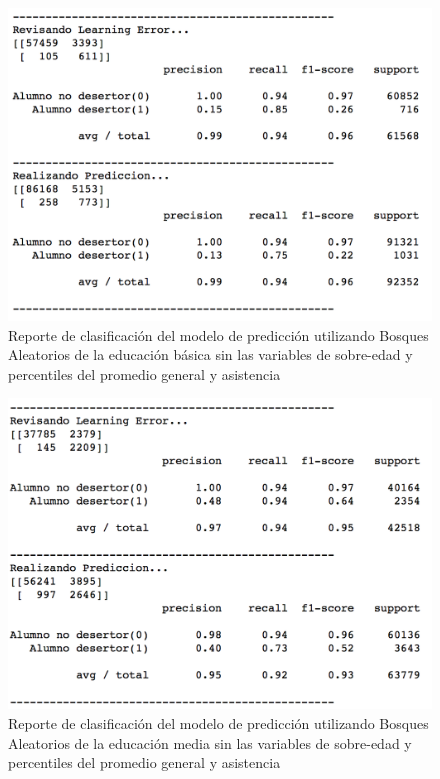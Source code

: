 \begin{figure}[H]
  \centering
    \includegraphics[trim=0cm 0cm 0cm 0cm,scale=0.65]{Figuras/7AnalisisResultado/clas-basica.png}
      \caption{Reporte de clasificación del modelo de predicción utilizando Bosques Aleatorios de la educación básica sin las variables de sobre-edad y percentiles del promedio general y asistencia}
    \label{fig:clas-basica}
\end{figure}
\begin{figure}[H]
  \centering
    \includegraphics[trim=0cm 0cm 0cm 0cm,scale=0.65]{Figuras/7AnalisisResultado/clas-media.png}
      \caption{Reporte de clasificación del modelo de predicción utilizando Bosques Aleatorios de la educación media sin las variables de sobre-edad y percentiles del promedio general y asistencia}
    \label{fig:clas-media}
\end{figure}

